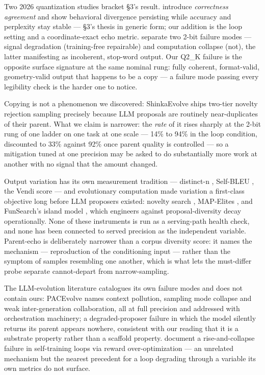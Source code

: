 Two 2026 quantization studies bracket \S3's result. \citet{rababah2026illusionequivalencystatisticalcharacterization} introduce \emph{correctness agreement} and show behavioral divergence persisting while accuracy and perplexity stay stable --- \S3's thesis in generic form; our addition is the loop setting and a coordinate-exact echo metric. \citet{zhou2026signaldegradationcomputationcollapse} separate two 2-bit failure modes --- signal degradation (training-free repairable) and computation collapse (not), the latter manifesting as incoherent, stop-word output. Our Q2\_K failure is the opposite surface signature at the same nominal rung: fully coherent, format-valid, geometry-valid output that happens to be a copy --- a failure mode passing every legibility check is the harder one to notice.

Copying is not a phenomenon we discovered: ShinkaEvolve \citep{lange2025shinkaevolveopenendedsampleefficientprogram} ships two-tier novelty rejection sampling precisely because LLM proposals are routinely near-duplicates of their parent. What we claim is narrower: the \emph{rate} of it rises sharply at the 2-bit rung of one ladder on one task at one scale --- 14\% to 94\% in the loop condition, discounted to 33\% against 92\% once parent quality is controlled --- so a mitigation tuned at one precision may be asked to do substantially more work at another with no signal that the amount changed.

Output variation has its own measurement tradition --- distinct-n \citep{li2016diversitypromotingobjectivefunctionneural}, Self-BLEU \citep{zhu2018texygenbenchmarkingplatformtext}, the Vendi score \citep{friedman2023vendiscorediversityevaluation} --- and evolutionary computation made variation a first-class objective long before LLM proposers existed: novelty search \citep{lehman2011abandoningobjectives}, MAP-Elites \citep{mouret2015illuminatingsearchspacesmapping}, and FunSearch's island model \citep{romeraparedes2024mathematicaldiscoveries}, which engineers against proposal-diversity decay operationally. None of these instruments is run as a serving-path health check, and none has been connected to served precision as the independent variable. Parent-echo is deliberately narrower than a corpus diversity score: it names the mechanism --- reproduction of the conditioning input --- rather than the symptom of samples resembling one another, which is what lets the must-differ probe separate cannot-depart from narrow-sampling.

The LLM-evolution literature catalogues its own failure modes and does not contain ours: PACEvolve \citep{yan2026pacevolveenablinglonghorizonprogressaware} names context pollution, sampling mode collapse and weak inter-generation collaboration, all at full precision and addressed with orchestration machinery; a degraded-proposer failure in which the model silently returns its parent appears nowhere, consistent with our reading that it is a substrate property rather than a scaffold property. \citet{lin2026selfimprovementselfregressriseandcollapsefailure} document a rise-and-collapse failure in self-training loops via reward over-optimization --- an unrelated mechanism but the nearest precedent for a loop degrading through a variable its own metrics do not surface.

